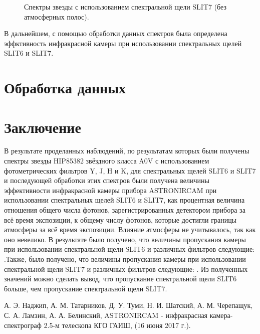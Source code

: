 \documentclass[a4paper]{article}
\begin{document}
\begin{figure}[h]
\begin{minipage}[h]{0.50\linewidth}
\end{minipage}
\begin{minipage}[h]{0.50\linewidth}
\end{minipage}
\caption{Спектры звезды с использованием спектральной щели SLIT7 (без атмосферных полос).}
\label{ris:image3}
\end{figure}

В дальнейшем, с помощью обработки данных спектров была определена эффктивность инфракрасной камеры при использовании спектральных щелей SLIT6 и SLIT7.

\hfill\break

\section{Обработка данных}







\hfill\break

\section{Заключение}
В результате проделанных наблюдений, по результатам которых были получены спектры звезды HIP85382 звёздного класса A0V с использованием фотометрических фильтров Y, J, H и K, для спектральных щелей SLIT6 и SLIT7 и последующей обработки этих спектров были получена величины эффективности инфракрасной камеры прибора ASTRONIRCAM при использовании спектральных щелей SLIT6 и SLIT7, как процентная величина отношения общего числа фотонов, зарегистрированных детектором прибора за всё время экспозиции, к общему числу фотонов, которые достигли границы атмосферы за всё время экспозиции. Влияние атмосферы не учитывалось, так как оно невелико. В результате было получено, что величины пропускания камеры при использовании спектральной щели SLIT6 и различных фильтров следующие:     .Также, было получено, что величины пропускания камеры при использовании спектральной щели SLIT7 и различных фильтров следующие:          . Из полученных значений можно сделать вывод, что пропускание спектральной щели SLIT6 больше, чем пропускание спектральной щели SLIT7.

\hfill\break

\begin{thebibliography}{3}
А. Э. Наджип, А. М. Татарников, Д. У. Туми, Н. И. Шатский, А. М. Черепащук, С. А. Ламзин, А. А. Белинский,  ASTRONIRCAM - инфракрасная камера-спектрограф 2.5-м телескопа КГО ГАИШ, (16 июня 2017 г.).
\end{thebibliography}
\end{document}
